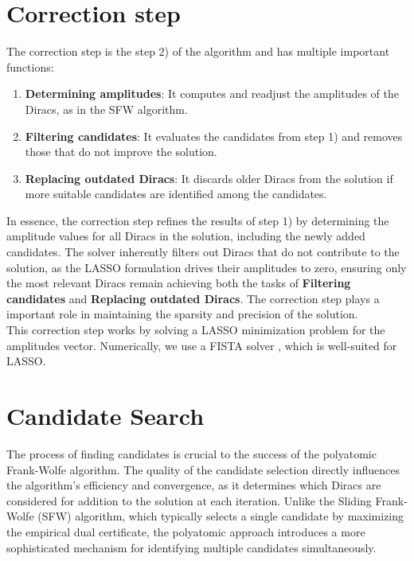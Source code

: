 \documentclass[a4paper,12pt,oneside]{report}
\theoremstyle{named}
\begin{document}
\section{Correction step} \label{correction}
The correction step is the step 2) of the algorithm and has multiple important functions:

\begin{enumerate}
    \item \textbf{Determining amplitudes}: It computes and readjust the amplitudes of the Diracs, as in the SFW algorithm.
    \item \textbf{Filtering candidates}: It evaluates the candidates from step 1) and removes those that do not improve the solution.
    \item \textbf{Replacing outdated Diracs}: It discards older Diracs from the solution if more suitable candidates are identified among the candidates.
\end{enumerate}

In essence, the correction step refines the results of step 1) by determining the amplitude values for all Diracs in the solution, including the newly added candidates. The solver inherently filters out Diracs that do not contribute to the solution, as the LASSO formulation drives their amplitudes to zero, ensuring only the most relevant Diracs remain achieving both the tasks of \textbf{Filtering candidates} and \textbf{Replacing outdated Diracs}. The correction step plays a important role in maintaining the sparsity and precision of the solution.\\

This correction step works by solving a LASSO minimization problem for the amplitudes vector. Numerically, we use a FISTA solver \cite{doi:10.1137/080716542}, which is well-suited for LASSO.

\section{Candidate Search} \label{candidates}
The process of finding candidates is crucial to the success of the polyatomic Frank-Wolfe algorithm. The quality of the candidate selection directly influences the algorithm’s efficiency and convergence, as it determines which Diracs are considered for addition to the solution at each iteration. Unlike the Sliding Frank-Wolfe (SFW) algorithm, which typically selects a single candidate by maximizing the empirical dual certificate, the polyatomic approach introduces a more sophisticated mechanism for identifying multiple candidates simultaneously.\\
\end{document}
